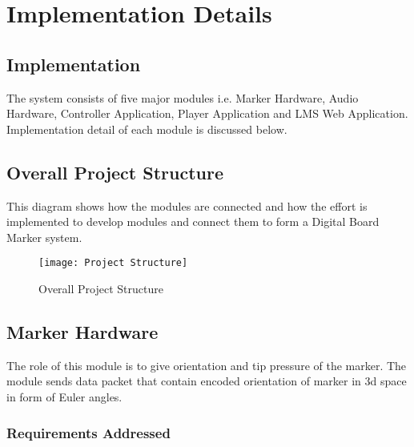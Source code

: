 
\chapter{Implementation Details} %
\label{Chapter4}

\section{Implementation}
The system consists of five major modules i.e. Marker Hardware, Audio Hardware, Controller Application, Player Application and LMS Web Application. Implementation detail of each module is discussed below.

\section{Overall Project Structure}
This diagram shows how the modules are connected and how the effort is implemented to develop modules and connect them to form a Digital Board Marker system.

\begin{figure}[h]
  \centering
  \texttt{[image: Project Structure]}
  \caption{Overall Project Structure}
\end{figure}

\section{Marker Hardware}
The role of this module is to give orientation and tip pressure of the marker. The module sends data packet that contain encoded orientation of marker in 3d space in form of Euler angles.

\subsection{Requirements Addressed}


